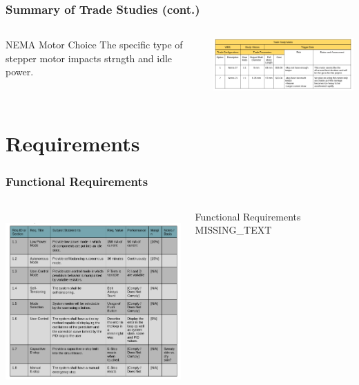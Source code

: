 \documentclass[aspectratio=169]{beamer}
\begin{document}
\begin{frame}
    \frametitle{Summary of Trade Studies (cont.)}

    \begin{columns}
        \begin{column}{0.28\textwidth}
            \begin{block}{NEMA Motor Choice}
                The specific type of stepper motor impacts strngth and idle power.
            \end{block}
        \end{column}

        \begin{column}{0.70\textwidth}
            \includegraphics[width=10.5cm]{MotorTradeStudy2}
        \end{column}
    \end{columns}

\end{frame}

\section{Requirements}
\begin{frame}
    \frametitle{Functional Requirements}

    \begin{columns}
        \begin{column}{0.70\textwidth}
            \includegraphics[height=7cm]{Functional1}
        \end{column}

        \begin{column}{0.28\textwidth}
            \begin{block}{Functional Requirements}
                MISSING\_TEXT
            \end{block}
        \end{column}
    \end{columns}

\end{frame}
\end{document}
